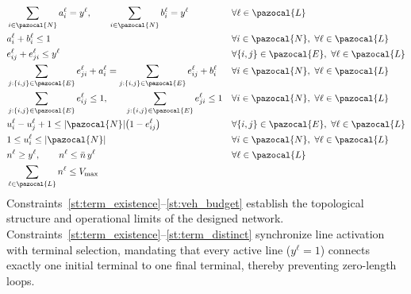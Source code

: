 \documentclass[a4paper,fleqn]{cas-sc}
\begin{document}
\begin{align}
& \sum_{i \in \pazocal{N}} a_i^\ell = y^\ell, \qquad
  \sum_{i \in \pazocal{N}} b_i^\ell = y^\ell
&& \forall \ell \in \pazocal{L} \label{st:term_existence}\\
& a_i^\ell + b_i^\ell \le 1
&& \forall i \in \pazocal{N},\ \forall \ell \in \pazocal{L} \label{st:term_distinct}\\
& e_{ij}^\ell + e_{ji}^\ell \le y^\ell
&& \forall \{i,j\} \in \pazocal{E},\ \forall \ell \in \pazocal{L} \label{st:edge_activation}\\
& \sum_{j:\{i,j\} \in \pazocal{E}} e_{ji}^\ell + a_i^\ell
=
\sum_{j:\{i,j\} \in \pazocal{E}} e_{ij}^\ell + b_i^\ell
&& \forall i \in \pazocal{N},\ \forall \ell \in \pazocal{L} \label{st:flow_balance}\\
& \sum_{j:\{i,j\} \in \pazocal{E}} e_{ij}^\ell \le 1, \qquad
  \sum_{j:\{i,j\} \in \pazocal{E}} e_{ji}^\ell \le 1
&& \forall i \in \pazocal{N},\ \forall \ell \in \pazocal{L} \label{st:simple_path}\\
& u_i^\ell - u_j^\ell + 1
\le |\pazocal{N}| \big(1-e_{ij}^\ell\big)
&& \forall \{i,j\} \in \pazocal{E},\ \forall \ell \in \pazocal{L} \label{st:mtz_fwd}
\\
& 1 \le u_i^\ell \le |\pazocal{N}|
&& \forall i \in \pazocal{N},\ \forall \ell \in \pazocal{L} \label{st:mtz_bound}\\
& n^\ell \ge y^\ell, \qquad
  n^\ell \le \bar n \, y^\ell
&& \forall \ell \in \pazocal{L} \label{st:veh_bounds}\\
& \sum_{\ell \in \pazocal{L}} n^\ell \le V_{\max}
&& \label{st:veh_budget}
\end{align}
%
Constraints~\eqref{st:term_existence}--\eqref{st:veh_budget} establish the topological structure and operational limits of the designed network. 
%
Constraints~\eqref{st:term_existence}--\eqref{st:term_distinct} synchronize line activation with terminal selection, mandating that every active line ($y^\ell=1$) connects exactly one initial terminal to one final terminal, thereby preventing zero-length loops. 
\end{document}
